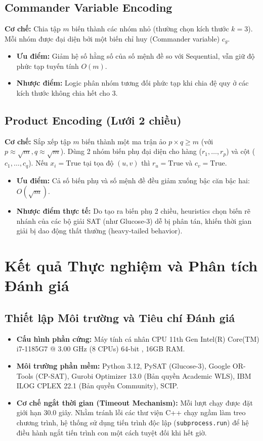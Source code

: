 \documentclass[a4paper,11pt]{article}
\begin{document}
\subsection{Commander Variable Encoding}
\textbf{Cơ chế:} Chia tập $m$ biến thành các nhóm nhỏ (thường chọn kích thước $k = 3$). Mỗi nhóm được đại diện bởi một biến chỉ huy (Commander variable) $c_g$.
\begin{itemize}
    \item \textbf{Ưu điểm:} Giảm hệ số hằng số của số mệnh đề so với Sequential, vẫn giữ độ phức tạp tuyến tính $O(m)$.
    \item \textbf{Nhược điểm:} Logic phân nhóm tương đối phức tạp khi chia đệ quy ở các kích thước không chia hết cho 3.
\end{itemize}

\subsection{Product Encoding (Lưới 2 chiều)}
\textbf{Cơ chế:} Sắp xếp tập $m$ biến thành một ma trận ảo $p \times q \ge m$ (với $p \approx \sqrt{m}, q \approx \sqrt{m}$). Dùng 2 nhóm biến phụ đại diện cho hàng ($r_1, \dots, r_p$) và cột ($c_1, \dots, c_q$). Nếu $x_i = \text{True}$ tại tọa độ $(u, v)$ thì $r_u = \text{True}$ và $c_v = \text{True}$.
\begin{itemize}
    \item \textbf{Ưu điểm:} Cả số biến phụ và số mệnh đề đều giảm xuống bậc căn bậc hai: $O(\sqrt{m})$.
    \item \textbf{Nhược điểm thực tế:} Do tạo ra biến phụ 2 chiều, heuristics chọn biến rẽ nhánh của các bộ giải SAT (như Glucose-3) dễ bị phân tán, khiến thời gian giải bị dao động thất thường (heavy-tailed behavior).
\end{itemize}

\section{Kết quả Thực nghiệm và Phân tích Đánh giá}

\subsection{Thiết lập Môi trường và Tiêu chí Đánh giá}
\begin{itemize}
    \item \textbf{Cấu hình phần cứng:} Máy tính cá nhân CPU 11th Gen Intel(R) Core(TM) i7-1185G7 @ 3.00 GHz (8 CPUs) 64-bit , 16GB RAM.
    \item \textbf{Môi trường phần mềm:} Python 3.12, PySAT (Glucose-3), Google OR-Tools (CP-SAT), Gurobi Optimizer 13.0 (Bản quyền Academic WLS), IBM ILOG CPLEX 22.1 (Bản quyền Community), SCIP.
    \item \textbf{Cơ chế ngắt thời gian (Timeout Mechanism):} Mỗi lượt chạy được đặt giới hạn 30.0 giây. Nhằm tránh lỗi các thư viện C++ chạy ngầm làm treo chương trình, hệ thống sử dụng tiến trình độc lập (\texttt{subprocess.run}) để hệ điều hành ngắt tiến trình con một cách tuyệt đối khi hết giờ.
\end{itemize}
\end{document}

